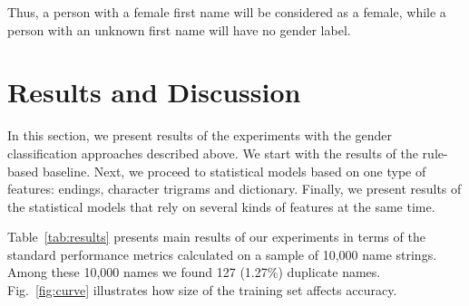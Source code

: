 \documentclass[runningheads,a4paper]{llncs}
\begin{document}
Thus, a person with a female first name will be considered as a female, while a person with an unknown first name will have no gender label. 


\section{Results and Discussion}

In this section, we present results of the experiments with the gender classification approaches described above. We start with the results of the rule-based baseline. Next, we proceed to statistical models based on one type of features: endings, character trigrams and dictionary. Finally, we present results of the statistical models that rely on several kinds of features at the same time. 

Table~\ref{tab:results} presents main results of our experiments in terms of the standard performance metrics calculated on a sample of 10,000 name strings. Among these 10,000 names we found 127 (1.27\%) duplicate names. Fig.~\ref{fig:curve} illustrates how size of the training set affects accuracy. 
\end{document}
